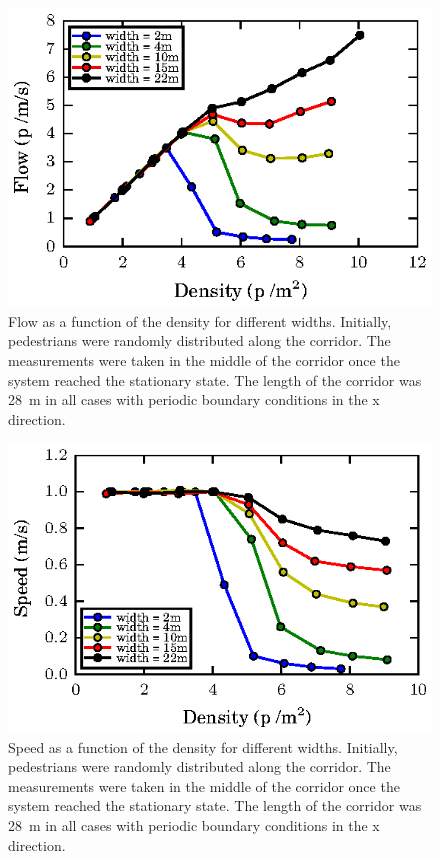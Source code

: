 \begin{figure}[htbp!]
\includegraphics[width=\columnwidth]
{plots/flow-density_vd1_multiple_widths.eps}
\caption{\label{fundamental_diagram_flow} Flow as a function of the density for different widths. Initially, 
pedestrians were randomly distributed along the corridor. The measurements were taken in the middle
of the corridor once the system reached the stationary state. The length of the corridor 
was 28~m in all cases with periodic boundary conditions in the x direction.}
\end{figure}


\begin{figure}[htbp!]
\includegraphics[width=\columnwidth]
{plots/speed-density_vd1_multiple_widths.eps}
\caption{\label{fundamental_diagram_speed} Speed as a function of the density for different widths. Initially, 
pedestrians were randomly distributed along the corridor. The measurements were taken in the middle
of the corridor once the system reached the stationary state. The length of the corridor 
was 28~m in all cases with periodic boundary conditions in the x direction.}
\end{figure}


